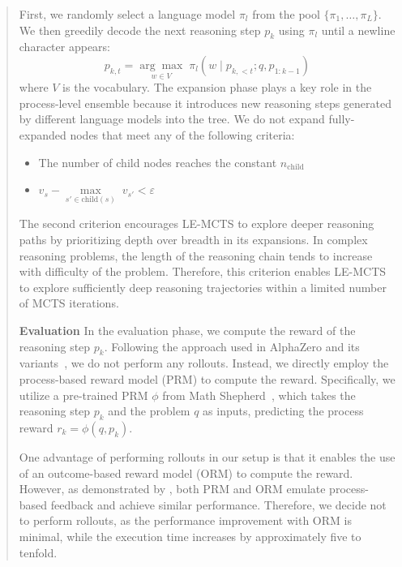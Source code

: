 \documentclass[11pt]{article}
\begin{document}
\begin{abstract}
First, we randomly select a language model \( \pi_l \) from the pool \( \{\pi_1, \dots, \pi_L\} \). 
We then greedily decode the next reasoning step \( p_k \) using \( \pi_l \) until a newline character appears:
\begin{equation}
    p_{k,t} = \underset{w \in V}{\arg\max} \; \pi_l(w \mid p_{k,<t}; q, p_{1:k-1})
\end{equation}
where \( V \) is the vocabulary.
The expansion phase plays a key role in the process-level ensemble because it introduces new reasoning steps generated by different language models into the tree.
We do not expand fully-expanded nodes that meet any of the following criteria:
\begin{itemize}
    \item The number of child nodes reaches the constant \( n_{\text{child}} \)
    \item \( v_s - \underset{s' \in \text{child}(s)}{\max} \; v_{s'} < \varepsilon \)
\end{itemize}
The second criterion encourages LE-MCTS to explore deeper reasoning paths by prioritizing depth over breadth in its expansions.
In complex reasoning problems, the length of the reasoning chain tends to increase with difficulty of the problem.
Therefore, this criterion enables LE-MCTS to explore sufficiently deep reasoning trajectories within a limited number of MCTS iterations.

\medskip
\par \noindent \textbf{Evaluation} \;
In the evaluation phase, we compute the reward of the reasoning step \( p_{k} \). 
Following the approach used in AlphaZero and its variants~\citep{silver-etal-2020-alphazero, feng-etal-2023-alphazerollm}, we do not perform any rollouts. 
Instead, we directly employ the process-based reward model (PRM) to compute the reward. 
Specifically, we utilize a pre-trained PRM \(\phi\) from Math Shepherd~\citep{wang-etal-2024-math}, which takes the reasoning step \( p_{k} \) and the problem \( q \) as inputs, predicting the process reward \(r_k=\phi(q, p_k)\).

One advantage of performing rollouts in our setup is that it enables the use of an outcome-based reward model (ORM) to compute the reward.
However, as demonstrated by \citet{uesato-etal-2022-oprm}, both PRM and ORM emulate process-based feedback and achieve similar performance. 
Therefore, we decide not to perform rollouts, as the performance improvement with ORM is minimal, while the execution time increases by approximately five to tenfold.


\end{abstract}
\end{document}

